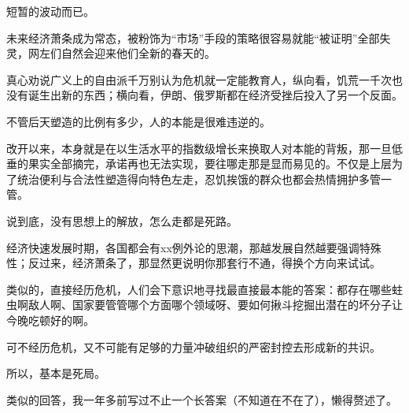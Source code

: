 \begin{zhihuanswer}
短暂的波动而已。

未来经济萧条成为常态，被粉饰为``市场''手段的策略很容易就能``被证明''全部失灵，网左们自然会迎来他们全新的春天的。

真心劝说广义上的自由派千万别认为危机就一定能教育人，纵向看，饥荒一千次也没有诞生出新的东西；横向看，伊朗、俄罗斯都在经济受挫后投入了另一个反面。

不管后天塑造的比例有多少，人的本能是很难违逆的。

改开以来，本身就是在以生活水平的指数级增长来换取人对本能的背叛，那一旦低垂的果实全部摘完，承诺再也无法实现，要往哪走那是显而易见的。不仅是上层为了统治便利与合法性塑造得向特色左走，忍饥挨饿的群众也都会热情拥护多管一管。

说到底，没有思想上的解放，怎么走都是死路。

经济快速发展时期，各国都会有xx例外论的思潮，那越发展自然越要强调特殊性；反过来，经济萧条了，那显然更说明你那套行不通，得换个方向来试试。

类似的，直接经历危机，人们会下意识地寻找最直接最本能的答案：都存在哪些蛀虫啊敌人啊、国家要管管哪个方面哪个领域呀、要如何揪斗挖掘出潜在的坏分子让今晚吃顿好的啊。

可不经历危机，又不可能有足够的力量冲破组织的严密封控去形成新的共识。

所以，基本是死局。

类似的回答，我一年多前写过不止一个长答案（不知道在不在了），懒得赘述了。
\end{zhihuanswer}
